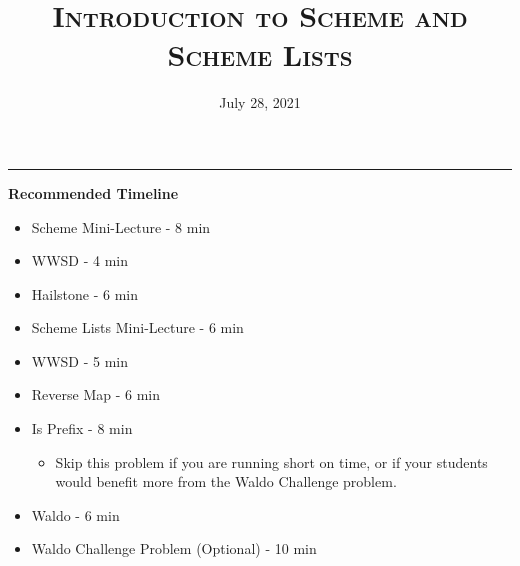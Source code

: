 \documentclass{exam}
\title{\textsc{Introduction to Scheme and Scheme Lists}}
\date{July 28, 2021}
\begin{document}
\maketitle
\rule{\textwidth}{0.15em}
\fontsize{12}{15}\selectfont

\begin{blocksection}
\begin{guide}
\textbf{Recommended Timeline}
\begin{itemize}
  \item Scheme Mini-Lecture - 8 min
  \item WWSD - 4 min
  \item Hailstone - 6 min
  \item Scheme Lists Mini-Lecture - 6 min
  \item WWSD - 5 min
  \item Reverse Map - 6 min
  \item Is Prefix - 8 min
  \begin{itemize}
    \item Skip this problem if you are running short on time, or if your students would benefit more from the Waldo Challenge problem.
  \end{itemize}
  \item Waldo - 6 min
  \item Waldo Challenge Problem (Optional) - 10 min
\end{itemize}
\end{guide}
\end{blocksection}
\end{document}
